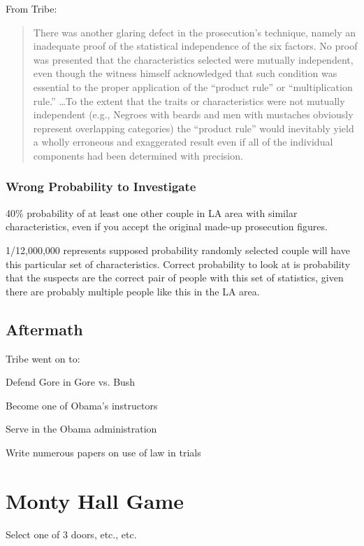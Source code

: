 \documentclass[letterpaper, landscape]{exam}
\begin{document}
  From Tribe:
  \begin{quote}
    \begin{em}
      There was another glaring defect in the prosecution’s technique, namely an
      inadequate proof of the statistical independence of the six factors. No
      proof was presented that the characteristics selected were mutually
      independent, even though the witness himself acknowledged that such
      condition was essential to the proper application of the ``product rule''
      or ``multiplication rule.'' \dots To the extent that the traits or
      characteristics were not mutually independent (e.g., Negroes with beards
      and men with mustaches obviously represent overlapping categories) the
      ``product rule'' would inevitably yield a wholly erroneous and exaggerated
      result even if all of the individual components had been determined with
      precision.
    \end{em}
  \end{quote}

  \subsubsection{Wrong Probability to Investigate}
    40\% probability of at least one other couple in LA area with similar
    characteristics, even if you accept the original made-up prosecution
    figures. 

    1/12,000,000 represents supposed probability randomly selected couple will
    have this particular set of characteristics. Correct probability to look at
    is probability that the suspects are the correct pair of people with this
    set of statistics, given there are probably multiple people like this in the
    LA area.


  \subsection{Aftermath}
  Tribe went on to:
  \begin{itemize*}
    \item Defend Gore in Gore vs. Bush
    \item Become one of Obama's instructors
    \item Serve in the Obama administration
    \item Write numerous papers on use of law in trials
  \end{itemize*}

  \section{Monty Hall Game}
  Select one of 3 doors, etc., etc.
\end{document}
